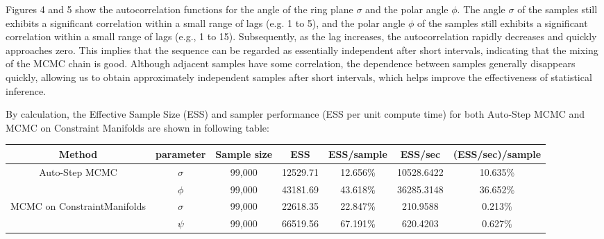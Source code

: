\documentclass{article}
\begin{document}



    
Figures 4 and 5 show the autocorrelation functions for the angle of the ring plane $\sigma$ and the polar angle $\phi$. The angle $\sigma$ of the samples still exhibits a significant correlation within a small range of lags (e.g. 1 to 5), and the polar angle $\phi$ of the samples still exhibits a significant correlation within a small range of lags (e.g., 1 to 15). Subsequently, as the lag increases, the autocorrelation rapidly decreases and quickly approaches zero. This implies that the sequence can be regarded as essentially independent after short intervals, indicating that the mixing of the MCMC chain is good. Although adjacent samples have some correlation, the dependence between samples generally disappears quickly, allowing us to obtain approximately independent samples after short intervals, which helps improve the effectiveness of statistical inference.

By calculation, the Effective Sample Size (ESS) and sampler performance (ESS per unit compute time) for both Auto-Step MCMC and MCMC on Constraint Manifolds are shown in following table:

\begin{center}
\begin{tabular}{ |c|c|c|c|c|c|c| } 
\hline
Method & parameter &Sample size& ESS & ESS/sample & ESS/sec & (ESS/sec)/sample  \\
\hline
\multirow{2}{5em}{Auto-Step MCMC} & $\sigma $& 99,000 & 12529.71 & 12.656\% & 10528.6422 & 10.635\%\\ 

&$\phi$ & 99,000 & 43181.69 & 43.618\%& 36285.3148 & 36.652\%\\
\hline
\multirow{2}{9em}{MCMC on ConstraintManifolds} & $\sigma$ & 99,000 & 22618.35 &22.847\% & 210.9588 & 0.213\%\\
& $\psi$ & 99,000 & 66519.56 & 67.191\% & 620.4203 & 0.627\% \\ 


\hline
\hline
\end{tabular}
\end{center}
\end{document}
